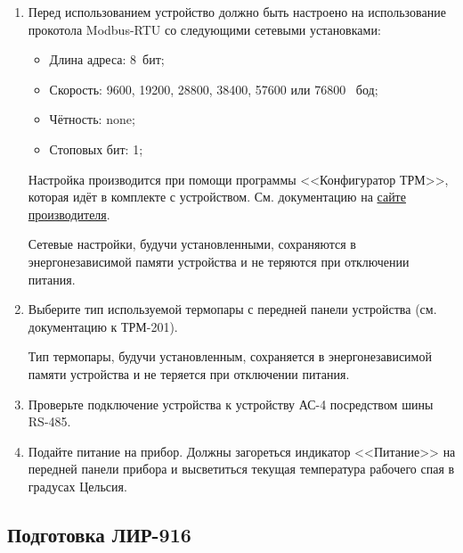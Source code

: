 \documentclass[12pt, a4paper, twocolumn]{book}
\begin{document}
\begin{enumerate}

\item Перед использованием устройство должно быть настроено на использование прокотола Modbus-RTU со следующими сетевыми установками:

\begin{itemize}
\item Длина адреса: 8~бит;
\item Скорость: 9600, 19200, 28800, 38400, 57600 или 76800 ~бод;
\item Чётность: none;
\item Стоповых бит: 1;
\end{itemize}

Настройка производится при помощи программы <<Конфигуратор ТРМ>>, которая идёт в комплекте с устройством. См. документацию на \href{http://www.owen.ru/catalog/izmeritel_regulyator_odnokanal_nij_s_rs_485_oven_trm201/opisanie}{сайте производителя}.

Сетевые настройки, будучи установленными, сохраняются в энергонезависимой памяти устройства и не теряются при отключении питания.

\item Выберите тип используемой термопары с передней панели устройства (см. документацию к ТРМ-201).

Тип термопары, будучи установленным, сохраняется в энергонезависимой памяти устройства и не теряется при отключении питания.

\item Проверьте подключение устройства к устройству АС-4 посредством шины RS-485.

\item Подайте питание на прибор. Должны загореться индикатор <<Питание>> на передней панели прибора и высветиться текущая температура рабочего спая в градусах Цельсия.

\end{enumerate}

\subsection{Подготовка ЛИР-916}
\end{document}

